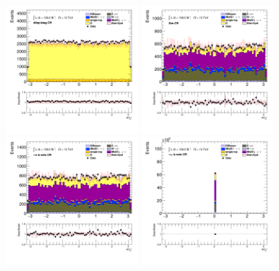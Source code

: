 		\begin{figure}[!htp]
			\begin{center}    
			\includegraphics[width=0.45\textwidth]{chapters/chapter6_HPlus/images/taulep/el_0_phi_DILEP_BTAG.png}
			\includegraphics[width=0.45\textwidth]{chapters/chapter6_HPlus/images/taulep/el_0_phi_ZEE.png} \\
			\includegraphics[width=0.45\textwidth]{chapters/chapter6_HPlus/images/taulep/el_0_phi_TAUEL_BVETO.png} 
			\includegraphics[width=0.45\textwidth]{chapters/chapter6_HPlus/images/taulep/el_0_phi_TAUMU_BVETO.png} \\

\end{center}
\end{figure}
